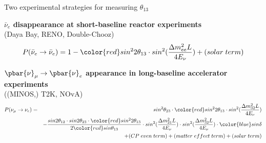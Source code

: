 %
%
%

\begin{frame}{Two experimental strategies for measuring $\theta_{13}$}

\begin{itemize}
{\small
  \item {\bf $\bar{\nu}_{e}$ disappearance at short-baseline reactor experiments}\\
  \vspace{0.2cm}
  (Daya Bay, RENO, Double-Chooz)
  {\scriptsize
   \[
     \displaystyle
     P(\bar{\nu}_{e} \rightarrow \bar{\nu}_{e}) =
       1 - {\color{red}sin^{2}2\theta_{13}} \cdot sin^{2}(\frac{{\Delta}m^{2}_{ee} L}{4E_{\nu}})
         + (solar\;term)
   \]
  }
  \item {\bf $\pbar{\nu}_{\mu} \rightarrow \pbar{\nu}_{e}$ appearance in
  long-baseline accelerator experiments}\\
  \vspace{0.2cm}
  ((MINOS,) T2K, NOvA)
  {\scriptsize
   \begin{eqnarray*}
     \displaystyle
     P({\nu}_{\mu} \rightarrow {\nu}_{e})  & = &
         sin^{2}\theta_{23} \cdot {\color{red}sin^{2}2\theta_{13}} \cdot sin^{2}(\frac{{\Delta}m^{2}_{32} L}{4E_{\nu}}) \\
      & & - \frac{sin2\theta_{12} \cdot sin2\theta_{23} \cdot {\color{red}sin^{2}2\theta_{13}}}{2{\color{red}sin\theta_{13}}}
              \cdot sin^{2}(\frac{{\Delta}m^{2}_{21} L}{4E_{\nu}})
              \cdot sin^{2}(\frac{{\Delta}m^{2}_{32} L}{4E_{\nu}}) \cdot {\color{blue}sin\delta}  \\
      & & + (CP\;even\;term) + (matter\;effect\;term) + (solar\;term)
   \end{eqnarray*}
  }
}
\end{itemize}
\end{frame}


